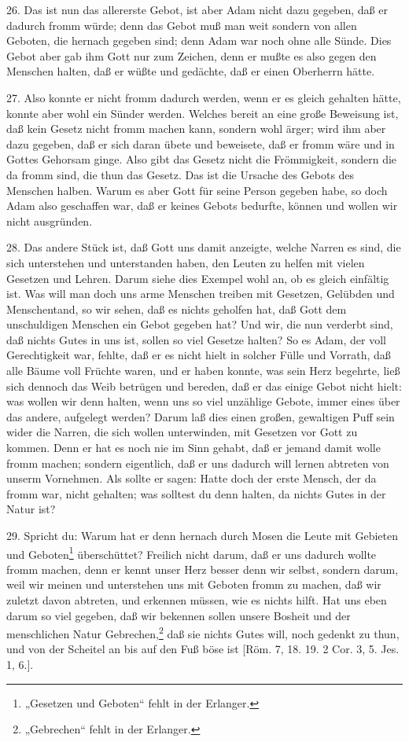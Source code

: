 26. Das ist nun das allererste Gebot, ist aber Adam nicht dazu gegeben, daß er dadurch fromm würde; denn das Gebot muß man weit sondern von allen Geboten, die hernach gegeben sind; denn Adam war noch ohne alle Sünde. Dies Gebot aber gab ihm Gott nur zum Zeichen, denn er mußte es also gegen den Menschen halten, daß er wüßte und gedächte, daß er einen Oberherrn hätte.

27. Also konnte er nicht fromm dadurch werden, wenn er es gleich gehalten hätte, konnte aber wohl ein Sünder werden. Welches bereit an eine große Beweisung ist, daß kein Gesetz nicht fromm machen kann, sondern wohl ärger; wird ihm aber dazu gegeben, daß er sich daran übete und beweisete, daß er fromm wäre und in Gottes Gehorsam ginge. Also gibt das Gesetz nicht die Frömmigkeit, sondern die da fromm sind, die thun das Gesetz. Das ist die Ursache des Gebots des Menschen halben. Warum es aber Gott für seine Person gegeben habe, so doch Adam also geschaffen war, daß er keines Gebots bedurfte, können und wollen wir nicht ausgründen.

28. Das andere Stück ist, daß Gott uns damit anzeigte, welche Narren es sind, die sich unterstehen und unterstanden haben, den Leuten zu helfen mit vielen Gesetzen und Lehren. Darum siehe dies Exempel wohl an, ob es gleich einfältig ist. Was will man doch uns arme Menschen treiben mit Gesetzen, Gelübden und Menschentand, so wir sehen, daß es nichts geholfen hat, daß Gott dem unschuldigen Menschen ein Gebot gegeben hat? Und wir, die nun verderbt sind, daß nichts Gutes in uns ist, sollen so viel Gesetze halten? So es Adam, der voll Gerechtigkeit war, fehlte, daß er es nicht hielt in solcher Fülle und Vorrath, daß alle Bäume voll Früchte waren, und er haben konnte, was sein Herz begehrte, ließ sich dennoch das Weib betrügen und bereden, daß er das einige Gebot nicht hielt: was wollen wir denn halten, wenn uns so viel unzählige Gebote, immer eines über das andere, aufgelegt werden? Darum laß dies einen großen, gewaltigen Puff sein wider die Narren, die sich wollen unterwinden, mit Gesetzen vor Gott zu kommen. Denn er hat es noch nie im Sinn gehabt, daß er jemand damit wolle fromm machen; sondern eigentlich, daß er uns dadurch will lernen abtreten von unserm Vornehmen. Als sollte er sagen: Hatte doch der erste Mensch, der da fromm war, nicht gehalten; was solltest du denn halten, da nichts Gutes in der Natur ist?

29. Spricht du: Warum hat er denn hernach durch Mosen die Leute mit Gebieten und Geboten\footnote{„Gesetzen und Geboten“ fehlt in der Erlanger.} überschüttet? Freilich nicht darum, daß er uns dadurch wollte fromm machen, denn er kennt unser Herz besser denn wir selbst, sondern darum, weil wir meinen und unterstehen uns mit Geboten fromm zu machen, daß wir zuletzt davon abtreten, und erkennen müssen, wie es nichts hilft. Hat uns eben darum so viel gegeben, daß wir bekennen sollen unsere Bosheit und der menschlichen Natur Gebrechen,\footnote{„Gebrechen“ fehlt in der Erlanger.} daß sie nichts Gutes will, noch gedenkt zu thun, und von der Scheitel an bis auf den Fuß böse ist [Röm. 7, 18. 19. 2 Cor. 3, 5. Jes. 1, 6.].

